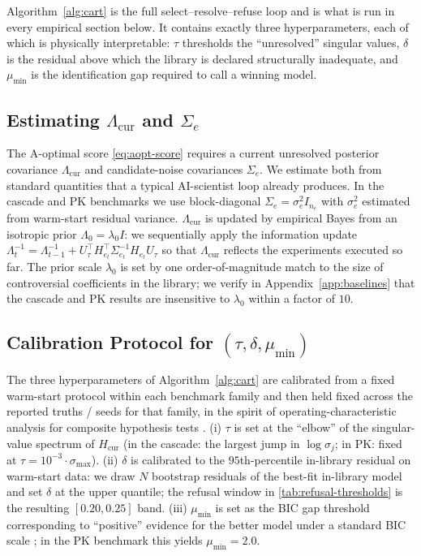 \documentclass{article}
\theoremstyle{plain}
\theoremstyle{definition}
\theoremstyle{remark}
\begin{document}
Algorithm~\ref{alg:cart} is the full select--resolve--refuse loop and is what
is run in every empirical section below. It contains exactly three
hyperparameters, each of which is physically interpretable: $\tau$
thresholds the ``unresolved'' singular values, $\delta$ is the residual
above which the library is declared structurally inadequate, and
$\mu_{\min}$ is the identification gap required to call a winning model.

\subsection{Estimating $\Lambda_{\mathrm{cur}}$ and $\Sigma_e$}

The A-optimal score \eqref{eq:aopt-score} requires a current unresolved
posterior covariance $\Lambda_{\mathrm{cur}}$ and candidate-noise
covariances $\Sigma_e$. We estimate both from standard quantities that a
typical AI-scientist loop already produces. In the cascade and PK
benchmarks we use block-diagonal $\Sigma_e=\sigma_e^2 I_{n_e}$ with
$\sigma_e^2$ estimated from warm-start residual variance. $\Lambda_{\mathrm{cur}}$
is updated by empirical Bayes from an isotropic prior
$\Lambda_0=\lambda_0 I$: we sequentially apply the information update
$\Lambda_t^{-1}=\Lambda_{t-1}^{-1}+U_\tau^\top H_{e_t}^\top \Sigma_{e_t}^{-1} H_{e_t} U_\tau$
so that $\Lambda_{\mathrm{cur}}$ reflects the experiments executed so far.
The prior scale $\lambda_0$ is set by one order-of-magnitude match to the
size of controversial coefficients in the library; we verify in
Appendix~\ref{app:baselines} that the cascade and PK results are
insensitive to $\lambda_0$ within a factor of $10$.

\subsection{Calibration Protocol for $(\tau,\delta,\mu_{\min})$}
\label{sec:calib}

The three hyperparameters of Algorithm~\ref{alg:cart} are calibrated from a
fixed warm-start protocol within each benchmark family and then held fixed
across the reported truths / seeds for that family, in the spirit of
operating-characteristic analysis for composite hypothesis tests
\citep{pronzato2008identifiability,fedorov2014model}. (i) $\tau$ is set at
the ``elbow'' of the singular-value spectrum of $H_{\mathrm{cur}}$ (in the
cascade: the largest jump in $\log\sigma_j$; in PK: fixed at
$\tau=10^{-3}\cdot\sigma_{\max}$). (ii) $\delta$ is calibrated to the
$95$th-percentile in-library residual on warm-start data: we draw $N$
bootstrap residuals of the best-fit in-library model and set $\delta$ at
the upper quantile; the refusal window in \cref{tab:refusal-thresholds} is
the resulting $[0.20,0.25]$ band. (iii) $\mu_{\min}$ is set as the BIC
gap threshold corresponding to ``positive'' evidence for the better model
under a standard BIC scale \citep{kass1995bayes}; in the PK benchmark this yields
$\mu_{\min}=2.0$.
\end{document}
